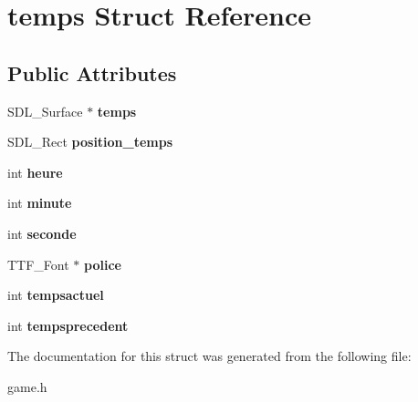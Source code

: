 \hypertarget{structtemps}{}\section{temps Struct Reference}
\label{structtemps}
\subsection*{Public Attributes}
\begin{DoxyCompactItemize}
\item 
\mbox{\label{structtemps_a7d7a2f168de64da7a90c777ad6342e70}} 
S\+D\+L\+\_\+\+Surface $\ast$ {\bfseries temps}
\item 
\mbox{\label{structtemps_ad2172dd6b2d1d93ca71df2759d16e714}} 
S\+D\+L\+\_\+\+Rect {\bfseries position\+\_\+temps}
\item 
\mbox{\label{structtemps_aec577f8a469d72f6326e3742c4688dfa}} 
int {\bfseries heure}
\item 
\mbox{\label{structtemps_ada849ec3e905055d1e18bb64bbac6eec}} 
int {\bfseries minute}
\item 
\mbox{\label{structtemps_ada48cf0744cb63ad8cf89ed59f7d68ce}} 
int {\bfseries seconde}
\item 
\mbox{\label{structtemps_a5496aa7ef92a402878dfa83dc44cb570}} 
T\+T\+F\+\_\+\+Font $\ast$ {\bfseries police}
\item 
\mbox{\label{structtemps_a32a30995997028bbec1b3ac9d1e22860}} 
int {\bfseries tempsactuel}
\item 
\mbox{\label{structtemps_a14fff96aab4ca705a91671b616aaebac}} 
int {\bfseries tempsprecedent}
\end{DoxyCompactItemize}


The documentation for this struct was generated from the following file\+:\begin{DoxyCompactItemize}
\item 
game.\+h\end{DoxyCompactItemize}
